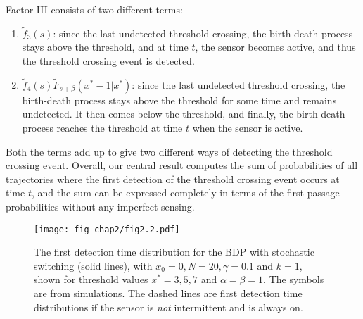 Factor III consists of two different terms:
\begin{enumerate}
    \item $\widetilde{f}_3(s)$: since the last undetected threshold crossing, the birth-death process stays above the threshold, and at time $t$, the sensor becomes active, and thus the threshold crossing event is detected.
    \item $\widetilde{f}_4(s)\widetilde{F}_{s+\beta}(x^*-1|x^*)$: since the last undetected threshold crossing, the birth-death process stays above the threshold for some time and remains undetected. It then comes below the threshold, and finally, the birth-death process reaches the threshold at time $t$ when the sensor is active.
\end{enumerate}
Both the terms add up to give two different ways of detecting the threshold crossing event. Overall, our central result computes the sum of probabilities of all trajectories where the first detection of the threshold crossing event occurs at time $t$, and the sum can be expressed completely in terms of the first-passage probabilities without any imperfect sensing. 



\begin{figure}
    \centering
    \texttt{[image: fig\_chap2/fig2.2.pdf]}
    \caption{The first detection time distribution for the BDP with stochastic switching (solid lines), with $x_0=0, N=20, \gamma=0.1$ and $k=1$, shown for threshold values $x^* = 3, 5, 7$ and $\alpha =\beta=1$. The symbols are from simulations. The dashed lines are first detection time distributions if the sensor is {\sl not} intermittent and is always on.}
    \label{fdt1}
\end{figure}


